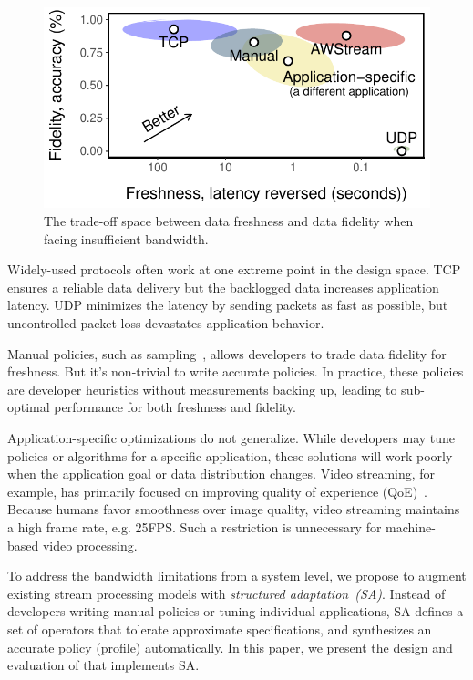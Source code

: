 \begin{figure}
  \centering
  \includegraphics[width=0.9\columnwidth]{figures/figure1a.pdf}
  \caption{The trade-off space between data freshness and data fidelity when
    facing insufficient bandwidth.}
  \label{fig:intro}
  \vspace{-1em}
\end{figure}

Widely-used protocols often work at one extreme point in the design space. TCP
ensures a reliable data delivery but the backlogged data increases application
latency. UDP minimizes the latency by sending packets as fast as possible, but
uncontrolled packet loss devastates application behavior.

Manual policies, such as sampling~\cite{rabkin2014aggregation}, allows
developers to trade data fidelity for freshness. But it's non-trivial to write
accurate policies. In practice, these policies are developer heuristics without
measurements backing up, leading to sub-optimal performance for both freshness
and fidelity.

Application-specific optimizations do not generalize. While developers may tune
policies or algorithms for a specific application, these solutions will work
poorly when the application goal or data distribution changes. Video streaming,
for example, has primarily focused on improving quality of experience
(QoE)~\cite{yin2015control}. Because humans favor smoothness over image quality,
video streaming maintains a high frame rate, e.g. 25FPS. Such a restriction is
unnecessary for machine-based video processing.

To address the bandwidth limitations from a system level, we propose to augment
existing stream processing models with \textit{structured
  adaptation~(SA)}. Instead of developers writing manual policies or tuning
individual applications, SA defines a set of operators that tolerate approximate
specifications, and synthesizes an accurate policy (profile) automatically. In
this paper, we present the design and evaluation of \sysname{} that implements
SA.

